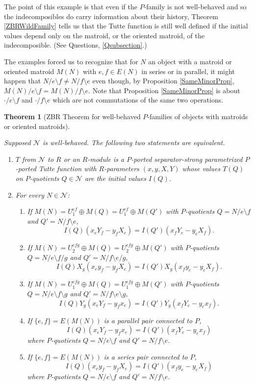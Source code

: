 \documentclass[12pt,leqno]{amsart}
\newtheorem{thm}[lem]{Theorem}
\theoremstyle{remark}
\begin{document}
The point of this example is that even if
the $P$-family is not well-behaved and so the
indecomposibles do carry information about their
history, Theorem \ref{ZBRWildFamily} tells 
us that the Tutte function
is still well defined if the initial values depend only
on the matroid, or the oriented matroid, of the 
indecomposible. (See Questions, \ref{Qsubsection}.)


The examples forced us to recognize that
for $N$ an object with a matroid or oriented matroid $M(N)$
with
${e,f}\in E(N)$ in series or in parallel,  it might
happen that $N/e\setminus f\neq N/f\setminus e$ even though,
by Proposition \ref{SameMinorProp}, 
$M(N)/e\setminus f= M(N)/f\setminus e$.  Note that 
Proposition \ref{SameMinorProp} is about 
$\cdot/e\setminus f$ and 
$\cdot/f\setminus e$ which are not commutations
of the same two operations.

\begin{thm}[ZBR Theorem for well-behaved 
$P$-families of objects with matroids or
oriented matroids]
\label{ZBRWellBehaved}

Supposed $\mathcal{N}$ is well-behaved.
The following two statements are equivalent.
\begin{enumerate}
\item $T$ from $\mathcal{N}$ to $R$ or an $R$-module is a $P$-ported 
separator-strong parametrized
$P$-ported Tutte function with $R$-parameters $(x, y, X, Y)$ whose values 
$T(Q)$ on $P$-quotients $Q\in\mathcal{N}$ are the initial
values $I(Q)$.
\item
For every $N\in\mathcal{N}$:
\begin{enumerate}
\item 
If $M(N)=U^{ef}_1\oplus M(Q)=U^{ef}_1\oplus M(Q')$ with 
$P$-quotients $Q=N/e\setminus f$ and $Q'=N/f\setminus e$,
\[
I(Q)(x_e Y_f - y_f X_e ) = 
I(Q')(x_f Y_e - y_e X_f).
\]
\item
If $M(N)=U^{efg}_2\oplus M(Q)=U^{efg}_2\oplus M(Q')$ with 
$P$-quotients $Q=N/e\setminus f/g$ 
and $Q'=N/f\setminus e/g$,
\[
I(Q)X_g(x_e y_f - y_f X_e ) = 
I(Q')X_g(x_f y_e - y_e X_f ).
\]
\item
If $M(N)=U^{efg}_1\oplus M(Q)=U^{efg}_1\oplus M(Q')$ with 
$P$-quotients $Q=N/e\setminus f\setminus g$  
and $Q'=N/f\setminus e\setminus g$,
\[
I(Q)Y_g(x_e Y_f - y_f x_e) = 
I(Q')Y_g(x_f Y_e - y_e x_f).
\]
\item
If $\{e,f\}=E(M(N))$ is a parallel pair connected to $P$, 
\[
I(Q)(x_e Y_f - y_f x_e) = 
I(Q')(x_f Y_e - y_e x_f)
\]
where $P$-quotients $Q=N/e\setminus f$
and $Q'=N/f\setminus e$.
\item
If $\{e,f\}=E(M(N))$ is a series pair connected to $P$, 
\[
I(Q)(x_e y_f - y_f X_e) = 
I(Q')(x_f y_e - y_e X_f)
\]
where $P$-quotients
$Q=N/e\setminus f$ 
and $Q'=N/f\setminus e$.
\end{enumerate}
\end{enumerate}
\end{thm}
\end{document}
